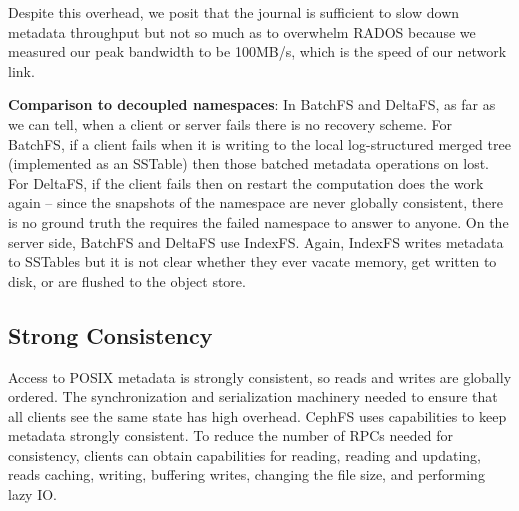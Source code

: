 Despite this overhead, we posit that the journal is sufficient to slow down
metadata throughput but not so much as to overwhelm RADOS because we measured
our peak bandwidth to be 100MB/s, which is the speed of our network link.

\textbf{Comparison to decoupled namespaces}: In BatchFS and DeltaFS, as far as
we can tell, when a client or server fails there is no recovery scheme. For
BatchFS, if a client fails when it is writing to the local log-structured
merged tree (implemented as an SSTable) then those batched metadata operations
on lost. For DeltaFS, if the client fails then on restart the computation does
the work again -- since the snapshots of the namespace are never globally
consistent, there is no ground truth the requires the failed namespace to
answer to anyone. On the server side, BatchFS and DeltaFS use IndexFS. Again,
IndexFS writes metadata to SSTables but it is not clear whether they ever
vacate memory, get written to disk, or are flushed to the object store.

\subsection{Strong Consistency} 

Access to POSIX metadata is strongly consistent, so reads and writes are
globally ordered. The synchronization and serialization machinery needed to
ensure that all clients see the same state has high overhead.  CephFS uses
capabilities to keep metadata strongly consistent. To reduce the number of RPCs
needed for consistency, clients can obtain capabilities for reading, reading
and updating, reads caching, writing, buffering writes, changing the file size,
and performing lazy IO.

